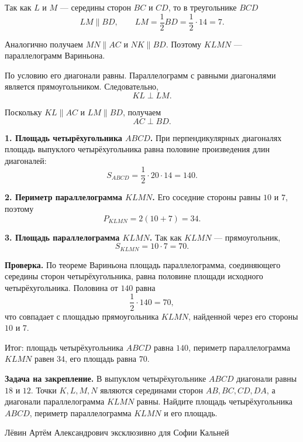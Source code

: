 \documentclass[12pt,a4paper]{article}
\begin{document}
Так как $L$ и $M$ --- середины сторон $BC$ и $CD$, то в треугольнике $BCD$
\[
LM\parallel BD,\qquad LM=\frac12 BD=\frac12\cdot14=7.
\]

Аналогично получаем $MN\parallel AC$ и $NK\parallel BD$. Поэтому $KLMN$ --- параллелограмм Вариньона.

По условию его диагонали равны. Параллелограмм с равными диагоналями является прямоугольником. Следовательно,
\[
KL\perp LM.
\]

Поскольку $KL\parallel AC$ и $LM\parallel BD$, получаем
\[
AC\perp BD.
\]

\textbf{1. Площадь четырёхугольника $ABCD$.}
При перпендикулярных диагоналях площадь выпуклого четырёхугольника равна половине произведения длин диагоналей:
\[
S_{ABCD}=\frac12\cdot20\cdot14=140.
\]

\textbf{2. Периметр параллелограмма $KLMN$.}
Его соседние стороны равны $10$ и $7$, поэтому
\[
P_{KLMN}=2(10+7)=34.
\]

\textbf{3. Площадь параллелограмма $KLMN$.}
Так как $KLMN$ --- прямоугольник,
\[
S_{KLMN}=10\cdot7=70.
\]

\textbf{Проверка.}
По теореме Вариньона площадь параллелограмма, соединяющего середины сторон четырёхугольника, равна половине площади исходного четырёхугольника. Половина от $140$ равна
\[
\frac12\cdot140=70,
\]
что совпадает с площадью прямоугольника $KLMN$, найденной через его стороны $10$ и $7$.

\textcolor{teal!60!black}{Итог:} площадь четырёхугольника $ABCD$ равна $140$, периметр параллелограмма $KLMN$ равен $34$, его площадь равна $70$.

\textbf{Задача на закрепление.}
В выпуклом четырёхугольнике $ABCD$ диагонали равны $18$ и $12$. Точки $K,L,M,N$ являются серединами сторон $AB,BC,CD,DA$, а диагонали параллелограмма $KLMN$ равны. Найдите площадь четырёхугольника $ABCD$, периметр параллелограмма $KLMN$ и его площадь.

\vfill
\begin{center}
\small Лёвин Артём Александрович эксклюзивно для Софии Кальней
\end{center}
\end{document}
